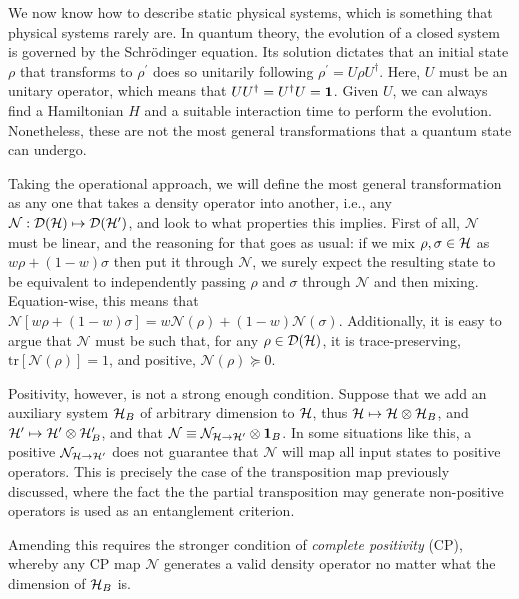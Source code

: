 		We now know how to describe static physical systems, which is something that physical systems rarely are. In quantum theory, the evolution of a closed system is governed by the Schrödinger equation. Its solution dictates that an initial state $\rho$ that transforms to $\rho^\prime$ does so unitarily following $\rho^\prime = U \rho U^\dagger$. Here, $U$ must be an unitary operator, which means that $UU^\dagger = U^\dagger U = \mathbf{1}$. Given $U$, we can always find a Hamiltonian $H$ and a suitable interaction time to perform the evolution. Nonetheless, these are not the most general transformations that a quantum state can undergo.
		
		Taking the operational approach, we will define the most general transformation as any one that takes a density operator into another, i.e., any $\mathcal{N} : \mathcal{D}(\mathcal{H}) \mapsto \mathcal{D}(\mathcal{H}^\prime)$, and look to what properties this implies. First of all, $\mathcal{N}$ must be linear, and the reasoning for that goes as usual: if we mix $\rho, \sigma \in \mathcal{H}$ as $w \rho + (1-w) \sigma$ then put it through $\mathcal{N}$, we surely expect the resulting state to be equivalent to independently passing $\rho$ and $\sigma$ through $\mathcal{N}$ and then mixing. Equation-wise, this means that $\mathcal{N} \left[ w \rho + (1-w) \sigma \right] = w \mathcal{N}(\rho) + (1-w) \mathcal{N}(\sigma)$. Additionally, it is easy to argue that $\mathcal{N}$ must be such that, for any $\rho \in \mathcal{D}(\mathcal{H})$, it is trace-preserving, $\text{tr}\left[ \mathcal{N}(\rho) \right] = 1$, and positive, $\mathcal{N}(\rho) \succeq 0$.
		
		Positivity, however, is not a strong enough condition. Suppose that we add an auxiliary system $\mathcal{H}_B$ of arbitrary dimension to $\mathcal{H}$, thus $\mathcal{H} \mapsto \mathcal{H} \otimes \mathcal{H}_B$, and $\mathcal{H}^\prime \mapsto \mathcal{H}^\prime \otimes \mathcal{H}^\prime_B$, and that $\mathcal{N} \equiv \mathcal{N}_{\mathcal{H} \rightarrow \mathcal{H}^\prime} \otimes \mathbf{1}_B$. In some situations like this, a positive $\mathcal{N}_{\mathcal{H} \rightarrow \mathcal{H}^\prime}$ does not guarantee that $\mathcal{N}$ will map all input states to positive operators. This is precisely the case of the transposition map previously discussed, where the fact the the partial transposition may generate non-positive operators is used as an entanglement criterion. 
		
		Amending this requires the stronger condition of \emph{complete positivity} (CP), whereby any CP map $\mathcal{N}$ generates a valid density operator no matter what the dimension of $\mathcal{H}_B$ is.
		
